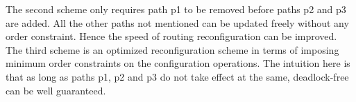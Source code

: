 The second scheme only requires path p1 to be removed before paths p2 and p3 are added. All the other paths not mentioned can be updated freely without any order constraint. Hence the speed of routing reconfiguration can be improved. The third scheme is an optimized reconfiguration scheme in terms of imposing minimum order constraints on the configuration operations. The intuition here is that as long as paths p1, p2 and p3 do not take effect at the same, deadlock-free can be well guaranteed. 





%
%
%
%	
%	

%

